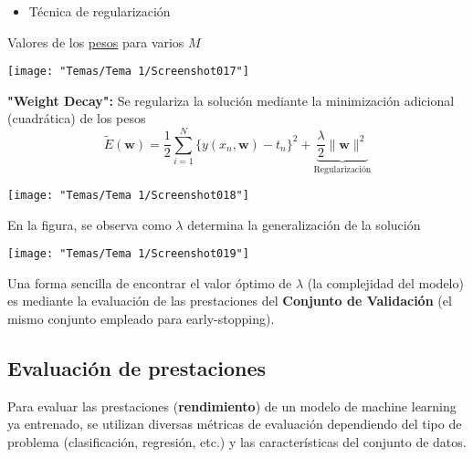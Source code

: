 \hspace{1cm}

\begin{itemize}[label=\color{red}\textbullet, leftmargin=*]
	\item \color{lightblue}Técnica de regularización
\end{itemize}
Valores de los \underline{pesos} para varios $M$
\begin{center}
	\texttt{[image: "Temas/Tema 1/Screenshot017"]}
\end{center}
\textbf{"Weight Decay":} Se regulariza la solución mediante la minimización adicional (cuadrática) de los pesos \[ \tilde{E}(\mathbf{w})=\dfrac{1}{2}\sum_{i=1}^{N}\{y(x_n,\mathbf{w})-t_n\}^2+\underbrace{\dfrac{\lambda}{2}\|\mathbf{w}\|^2}_{\text{Regularización}} \]
\begin{center}
	\texttt{[image: "Temas/Tema 1/Screenshot018"]}
\end{center}
\begin{minipage}{0.5\textwidth}
	En la figura, se observa como $\lambda$ determina la generalización de la solución
\end{minipage}\qquad\begin{minipage}{0.45\textwidth}
	\begin{center}
		\texttt{[image: "Temas/Tema 1/Screenshot019"]}
	\end{center}
\end{minipage}

Una forma sencilla de encontrar el valor óptimo de $\lambda$ (la complejidad del modelo) es mediante la evaluación de las prestaciones del \textbf{Conjunto de Validación} (el mismo conjunto empleado para early-stopping).
\subsection{Evaluación de prestaciones}
Para evaluar las prestaciones (\textbf{rendimiento}) de un modelo de machine learning ya entrenado, se utilizan diversas métricas de evaluación dependiendo del tipo de problema (clasificación, regresión, etc.) y las características del conjunto de datos.

